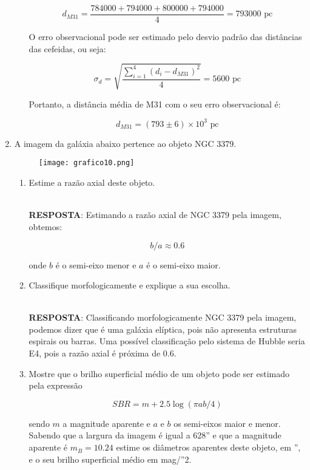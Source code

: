 \documentclass[a4paper,12pt]{article}
\begin{document}
\begin{enumerate}
\begin{enumerate}
$$d_{M31} = \frac{784000 + 794000 + 800000 + 794000}{4} = 793000 \text{ pc}$$

O erro observacional pode ser estimado pelo desvio padrão das distâncias das cefeidas, ou seja:

$$\sigma_{d} = \sqrt{\frac{\sum_{i=1}^{4}(d_i - d_{M31})^2}{4}} = 5600 \text{ pc}$$

Portanto, a distância média de M31 com o seu erro observacional é:

$$d_{M31} = (793 \pm 6) \times 10^3 \text{ pc}$$

\end{enumerate}

\noindent\hrulefill

\item A imagem da galáxia abaixo pertence ao objeto NGC 3379.

\begin{figure}[H]
    \centering
    \texttt{[image: grafico10.png]}
\end{figure}

\begin{enumerate}
\item Estime a razão axial deste objeto.

\noindent\hrulefill\\\textbf{RESPOSTA}: Estimando a razão axial de NGC 3379 pela imagem, obtemos:

$$b/a \approx 0.6$$

onde $b$ é o semi-eixo menor e $a$ é o semi-eixo maior.

\noindent\hrulefill

\item Classifique morfologicamente e explique a sua escolha.

\noindent\hrulefill\\\textbf{RESPOSTA}: Classificando morfologicamente NGC 3379 pela imagem, podemos dizer que é uma galáxia elíptica, pois não apresenta estruturas espirais ou barras. Uma possível classificação pelo sistema de Hubble seria E4, pois a razão axial é próxima de 0.6.

\noindent\hrulefill

\item Mostre que o brilho superficial médio de um objeto pode ser estimado pela expressão

$$SBR= m+2.5 \log(\pi ab/4)$$

sendo $m$ a magnitude aparente e $a$ e $b$ os semi-eixos maior e menor. Sabendo que a largura da imagem é igual a 628” e que a magnitude aparente é $m_B= 10.24$ estime os diâmetros aparentes deste objeto, em ”, e o seu brilho superficial médio em mag/”2.


\end{enumerate}
\end{enumerate}
\end{document}
